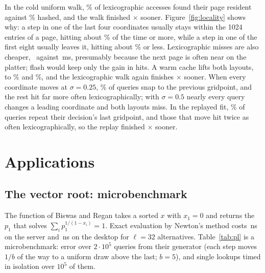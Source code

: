 \documentclass[preprint,12pt]{elsarticle}
\begin{document}
In the cold uniform walk, \hWalkLex\% of lexicographic accesses found their page
resident against \hWalkHash\% hashed, and the walk finished \hWalkTime$\times$ sooner.
Figure~\ref{fig:locality} shows why: a step in one
of the last four coordinates usually stays within the 1024 entries of a page, hitting about \hWalkTrailLo\% of the time or more, while a step in one of the first eight usually
leaves it, hitting about \hWalkLeadHi\% or less. Lexicographic misses are also cheaper, \hWalkMissLex\ against \hWalkMissHash\,ms, presumably because the next page is often near on the platter; flash would keep only the gain in hits. A warm cache lifts both layouts, to \hWarmLex\% and \hWarmHash\%, and the lexicographic walk again finishes \hWarmTime$\times$ sooner. When every coordinate moves at $\sigma=0.25$, \hGaussSame\% of queries snap to the previous gridpoint, and the rest hit far more often lexicographically; with $\sigma=0.5$ nearly every query changes a leading
coordinate and both layouts miss. In the replayed fit, \hTraceSame\% of queries repeat their decision's last gridpoint, and those that move hit twice as often lexicographically, so the replay finished \hTraceTime$\times$ sooner. 

\section{Applications}\label{sec:apps}

\subsection{The vector root: microbenchmark}\label{sec:app-pl}
The function of Biswas and Regan takes a sorted $x$ with $x_1=0$ and returns the
$p_1$ that solves $\sum_i p_1^{1/(1-x_i)}=1$. Exact evaluation by Newton's method
costs \hNewtonNs\,ns on the server and \hNewtonNsD\,ns on the desktop for
$\ell=32$ alternatives. Table~\ref{tab:pl} is a microbenchmark: error over $2\cdot10^5$ queries from their generator (each step moves $1/b$ of the way to a uniform draw above the last; $b=5$), and single lookups timed in isolation over $10^5$ of them.
\end{document}
